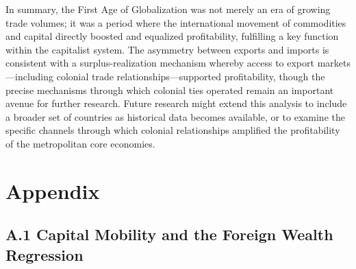 \documentclass[10pt]{article}
\begin{document}
\par In summary, the First Age of Globalization was not merely an era of growing trade volumes; it was a period where the international movement of commodities and capital directly boosted and equalized profitability, fulfilling a key function within the capitalist system. The asymmetry between exports and imports is consistent with a surplus-realization mechanism whereby access to export markets---including colonial trade relationships---supported profitability, though the precise mechanisms through which colonial ties operated remain an important avenue for further research. Future research might extend this analysis to include a broader set of countries as historical data becomes available, or to examine the specific channels through which colonial relationships amplified the profitability of the metropolitan core economies.




\section*{Appendix}
\setcounter{table}{0}
\setcounter{figure}{0}
\renewcommand{\thetable}{A\arabic{table}}
\renewcommand{\thefigure}{A\arabic{figure}}

\subsection*{A.1 Capital Mobility and the Foreign Wealth Regression}
\end{document}
